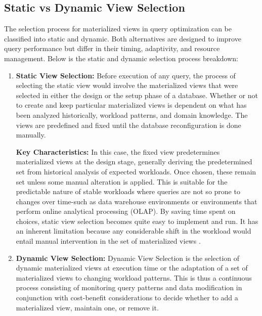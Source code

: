 \subsection{ Static vs Dynamic View Selection } The selection process for materialized views in query optimization can be classified into static and dynamic. Both alternatives are designed to improve query performance but differ in their timing, adaptivity, and resource management. Below is the static and dynamic selection process breakdown:
\begin{enumerate}
        \item \textbf{Static View Selection:} Before execution of any query, the process of selecting the static view would involve the materialized views that were selected in either the design or the setup phase of a database. Whether or not to create and keep particular materialized views is dependent on what has been analyzed historically, workload patterns, and domain knowledge. The views are predefined and fixed until the database reconfiguration is done manually.\vspace{.4cm}
    
    \textbf{Key Characteristics:} In this case, the fixed view predetermines materialized views at the design stage, generally deriving the predetermined set from historical analysis of expected workloads. Once chosen, these remain set unless some manual alteration is applied. This is suitable for the predictable nature of stable workloads where queries are not so prone to changes over time-such as data warehouse environments or environments that perform online analytical processing (OLAP). By saving time spent on choices, static view selection becomes quite easy to implement and run. It has an inherent limitation because any considerable shift in the workload would entail manual intervention in the set of materialized views \cite{lohman2000selftuning,mamoulis2012survey,gupta2002selftuning}.
    \item \textbf{Dynamic View Selection:} Dynamic View Selection is the selection of dynamic materialized views at execution time or the adaptation of a set of materialized views to changing workload patterns. This is thus a continuous process consisting of monitoring query patterns and data modification in conjunction with cost-benefit considerations to decide whether to add a materialized view, maintain one, or remove it.\vspace{.4cm}
    

\end{enumerate}
